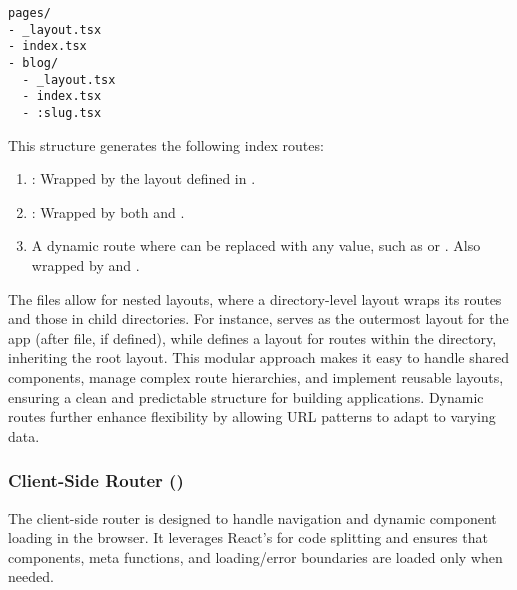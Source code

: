 \begin{verbatim}
pages/
- _layout.tsx
- index.tsx
- blog/
  - _layout.tsx
  - index.tsx
  - :slug.tsx
\end{verbatim}

This structure generates the following index routes:
\begin{enumerate}
	\item \cc{/}: Wrapped by the layout defined in .
	\item {}: Wrapped by both  and .
	\item {} A dynamic route where  can be replaced with any value, such as  or . Also wrapped by  and .
\end{enumerate}

The  files allow for nested layouts, where a directory-level layout wraps its routes and those in child directories. For instance,  serves as the outermost layout for the app (after  file, if defined), while  defines a layout for routes within the  directory, inheriting the root layout. This modular approach makes it easy to handle shared components, manage complex route hierarchies, and implement reusable layouts, ensuring a clean and predictable structure for building applications. Dynamic routes further enhance flexibility by allowing URL patterns to adapt to varying data.



\subsubsection{Client-Side Router ()}
The client-side router is designed to handle navigation and dynamic component loading in the browser. It leverages React’s  for code splitting and ensures that components, meta functions, and loading/error boundaries are loaded only when needed.

